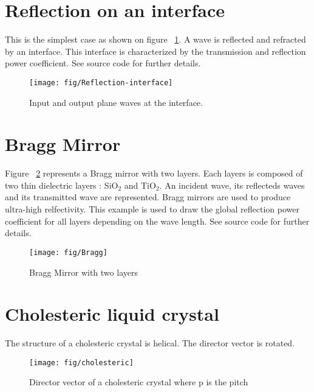 

\section{Reflection on an interface}
This is the  simplest case as shown on figure ~\ref{fig:Reflection-interface}. A wave is reflected and refracted by an interface. This interface is characterized by the  transmission and reflection power coefficient. See source code for further details.
\begin{figure}[!h]
\texttt{[image: fig/Reflection-interface]}
\caption{\label{fig:Reflection-interface}Input and output plane waves at the interface.}
\end{figure}


\section{Bragg Mirror}
Figure ~\ref{fig:Bragg} represents a Bragg mirror with two layers. Each layers is composed of two thin dielectric layers : SiO$_2$ and TiO$_2$. An incident wave, its reflecteds waves and its transmitted wave are represented. Bragg mirrors are used to produce ultra-high relfectivity. This example is used to draw the global reflection power coefficient for all layers depending on the wave length. See source code for further details.
\begin{figure}[!h]
\texttt{[image: fig/Bragg]}
\caption{\label{fig:Bragg}Bragg Mirror with two layers}
\end{figure}

\section{Cholesteric liquid crystal}
The structure of a cholesteric crystal is helical. The director vector is rotated.
\begin{figure}[!h]
\texttt{[image: fig/cholesteric]}
\caption{\label{fig:cholesteric}Director vector of a cholesteric crystal where p is the pitch}
\end{figure}
